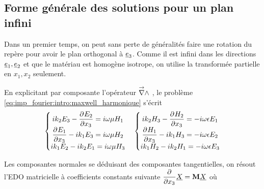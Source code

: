 
\subsection{Forme générale des solutions pour un plan infini}



Dans un premier temps, on peut sans perte de généralités faire une rotation du repère pour avoir le plan orthogonal à $\v e_3$. Comme il est infini dans les directions $\v e_1, \v e_2$ et que le matériau est homogène isotrope, on utilise la transformée partielle en $x_1, x_2$ seulement.

\renewcommand{\x}{{\v e_1}}
\renewcommand{\y}{{\v e_2}}
\renewcommand{\z}{{\v e_3}}
\renewcommand{\peps}{{\eps}}
\renewcommand{\pmu}{{\mu}}
\begin{figure}[h!]
\centering
\begin{tikzpicture}

\end{tikzpicture}
\end{figure}

En explicitant par composante l'opérateur $\vrot$ , le problème \eqref{eq:imp_fourier:intro:maxwell_harmonique} s'écrit  
\begin{align*}
    \left\lbrace 
    \begin{matrix}
    ik_2 E_3  - \ddr{x_3}{E_ 2} = i \w \mu H_1 \\
    \ddr{x_3}{E_1} - ik_1 E_3 = i\w \mu H_2 \\
    ik_1 E_2 - ik_2 E_1 = i\w \mu H_3 \\
    \end{matrix}
    \right. \quad 
    \left\lbrace 
    \begin{matrix}
    ik_2 H_3  - \ddr{x_3}{H_ 2} = -i \w \eps E_1 \\
    \ddr{x_3}{H_1} - ik_1 H_3 = -i\w \eps E_2 \\
    ik_1 H_2 - ik_2 H_1 = -i\w \eps E_3 \\
    \end{matrix}
    \right.
\end{align*}

Les composantes normales se déduisant des composantes tangentielles, on résout l'EDO matricielle à coefficients constants 
suivante $\ddr{x_3}{}\v{X} = \mat{M} \v{X}$ où

